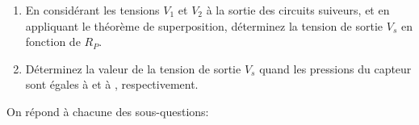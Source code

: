 \documentclass[12pt,titlepage]{article}
\begin{document}
{\begin{enumerate}
\begin{figure}[h!]
{}
			      \caption{Caractéristique résistance ($R_P$ en \unit{\Omega}) en fonction de la pression ($P$ en \unit{kN/m^2}) d'un capteur de pression à coefficient négatif.}
		      \end{figure}
		\item En considérant les tensions $V_1$ et $V_2$ à la sortie des circuits suiveurs, et en appliquant le théorème de superposition, déterminez la tension de sortie $V_s$ en fonction de $R_P$.
		\item Déterminez la valeur de la tension de sortie $V_s$ quand les pressions du capteur sont égales à  et à , respectivement.
	\end{enumerate}}On répond à chacune des sous-questions:
\end{document}
